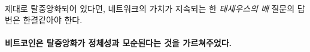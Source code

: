 \paragraph{}
제대로 탈중앙화되어 있다면, 네트워크의 가치가 지속되는 한 \textit{테세우스의 배} 질문의 답변은 한결같아야 한다.

\paragraph{비트코인은 탈중앙화가 정체성과 모순된다는 것을 가르쳐주었다.}

%
%
%
%
